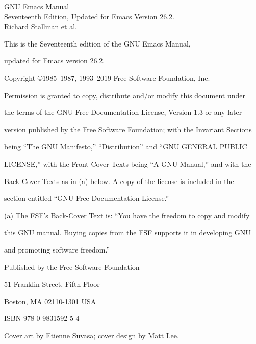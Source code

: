 \newpage
\vspace*{5cm}
\begin{center}
\Huge GNU Emacs Manual\normalall\\\vspace*{4cm}
Seventeenth Edition, Updated for Emacs Version 26.2.\\\vspace*{5cm}
Richard Stallman et al.
\end{center}
\newpage
\vspace*{8cm}
This is the Seventeenth edition of the GNU Emacs Manual,\par
updated for Emacs version 26.2.\par
Copyright \copyright 1985–1987, 1993–2019 Free Software Foundation, Inc.\par
Permission is granted to copy, distribute and/or modify this document under\par
the terms of the GNU Free Documentation License, Version 1.3 or any later\par
version published by the Free Software Foundation; with the Invariant Sections\par
being “The GNU Manifesto,” “Distribution” and “GNU GENERAL PUBLIC\par
LICENSE,” with the Front-Cover Texts being “A GNU Manual,” and with the\par
Back-Cover Texts as in (a) below. A copy of the license is included in the\par
section entitled “GNU Free Documentation License.”\par
(a) The FSF’s Back-Cover Text is: “You have the freedom to copy and modify\par
this GNU manual. Buying copies from the FSF supports it in developing GNU\par
and promoting software freedom.”\par
Published by the Free Software Foundation\par
51 Franklin Street, Fifth Floor\par
Boston, MA 02110-1301 USA\par
ISBN 978-0-9831592-5-4\par
Cover art by Etienne Suvasa; cover design by Matt Lee.